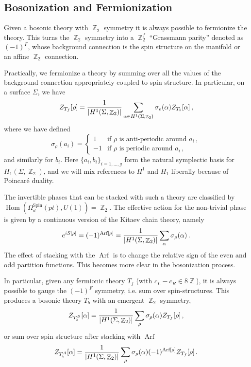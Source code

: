 \documentclass{article}
\DeclareMathOperator{\Hom}{Hom}
\DeclareMathOperator{\bbZ}{\mathbb{Z}}
\DeclareMathOperator{\Arf}{\textrm{Arf}}
\begin{document}
\subsection{Bosonization and Fermionization}
Given a bosonic theory with $\bbZ_2$ symmetry it is always possible to fermionize the theory. This turns the $\bbZ_2$ symmetry into a $\bbZ_2^f$ ``Grassmann parity'' denoted as $(-1)^F$, whose background connection is the spin structure on the manifold or an affine $\bbZ_2$ connection. 

Practically, we fermionize a theory by summing over all the values of the background connection appropriately coupled to spin-structure. In particular, on a surface $\Sigma$, we have
\begin{equation}
    Z_{T_f}[\rho] = \frac{1}{\abs{H^1(\Sigma,\bbZ_2)}}\sum_{\alpha\in H^1(\Sigma,\bbZ_2)} \sigma_\rho(\alpha) Z_{T_b}[\alpha]\,,
\end{equation}
where we have defined
\begin{equation}
    \sigma_\rho(a_i) = \begin{cases} 
		1 & \textrm{if $\rho$ is anti-periodic around $a_i$}\,, \\
		-1 & \textrm{if $\rho$ is periodic around $a_i$}\,,
	\end{cases}
\end{equation}
and similarly for $b_i$. Here $\{a_i,b_i\}_{i=1,\dots,g}$ form the natural symplectic basis for $H_1(\Sigma,\bbZ_2)$, and we will mix references to $H^1$ and $H_1$ liberally because of Poincar\'e duality.

The invertible phases that can be stacked with such a theory are classified by $\Hom(\Omega_d^{\textrm{Spin}}(pt),U(1)) = \bbZ_2$. The effective action for the non-trivial phase is given by a continuous version of the Kitaev chain theory, namely
\begin{equation}
    e^{iS[\rho]} = (-1)^{\Arf[\rho]} = \frac{1}{\abs{H^1(\Sigma,\bbZ_2)}} \sum_\alpha \sigma_\rho(\alpha)\,.
\end{equation}
The effect of stacking with the $\Arf$ is to change the relative sign of the even and odd partition functions. This becomes more clear in the bosonization process.

In particular, given any fermionic theory $T_f$ (with $c_L-c_R \in 8\bbZ$), it is always possible to gauge the $(-1)^F$ symmetry, i.e. sum over spin-structures. This produces a bosonic theory $T_b$ with an emergent $\bbZ_2$ symmetry,
\begin{equation}
    Z_{T_b^B}[\alpha] = \frac{1}{\abs{H^1(\Sigma,\bbZ_2)}}\sum_{\rho} \sigma_\rho(\alpha) Z_{T_f}[\rho]\,,
\end{equation}
or sum over spin structure after stacking with $\Arf$
\begin{equation}
    Z_{T_b^A}[\alpha] = \frac{1}{\abs{H^1(\Sigma,\bbZ_2)}}\sum_{\rho} \sigma_\rho(\alpha)(-1)^{\Arf[\rho]} Z_{T_f}[\rho]\,.
\end{equation}
\end{document}
